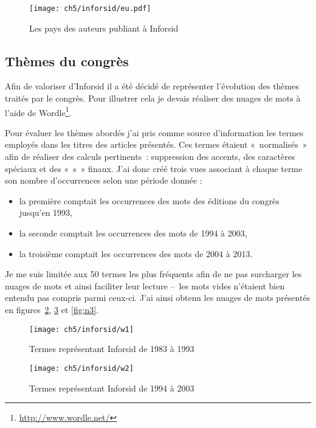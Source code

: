 			\begin{figure}[h]
				\centering
				\texttt{[image: ch5/inforsid/eu.pdf]}
				\caption{Les pays des auteurs publiant à Inforsid}\label{fig:eu}
			\end{figure}
			
			
		\subsection{Thèmes du congrès}
			Afin de valoriser d'Inforsid il a été décidé de représenter l'évolution des thèmes traités par le congrès. Pour illustrer cela je devais réaliser des nuages de mots à l'aide de Wordle\footnote{\url{http://www.wordle.net/}}.
			
			Pour évaluer les thèmes abordés j'ai pris comme source d'information les termes employés dans les titres des articles présentés. Ces termes étaient «~normalisés~» afin de réaliser des calculs pertinents~: suppression des accents, des caractères spéciaux et des «~s~» finaux. J'ai donc créé trois vues associant à chaque terme son nombre d'occurrences selon une période donnée :
			\begin{itemize}
				\item la première comptait les occurrences des mots des éditions du congrès jusqu'en 1993,
				\item la seconde comptait les occurrences des mots de 1994 à 2003,
				\item la troisième comptait les occurrences des mots de 2004 à 2013.
			\end{itemize}
			
			Je me suis limitée aux 50 termes les plus fréquents afin de ne pas surcharger les nuages de mots et ainsi faciliter leur lecture --~les mots vides n'étaient bien entendu pas compris parmi ceux-ci. J'ai ainsi obtenu les nuages de mots présentés en figures~\ref{fig:n1}, \ref{fig:n2} et \ref{fig:n3}.
			
			\begin{figure}[p]
				\centering
				\texttt{[image: ch5/inforsid/w1]}
				\caption{Termes représentant Inforsid de 1983 à 1993}\label{fig:n1}
			\end{figure}
			
			\begin{figure}[p]
				\centering
				\texttt{[image: ch5/inforsid/w2]}
				\caption{Termes représentant Inforsid de 1994 à 2003}\label{fig:n2}
			\end{figure}
			
